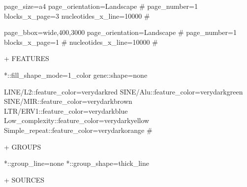 \documentclass[11pt]{article}
\def\nwendcode{\endtrivlist \endgroup} %
\let\nwdocspar=\par                    %
\begin{document}
\nwenddocs{}\endmoddef
page_size=a4
page_orientation=Landscape
# page_number=1
blocks_x_page=3
nucleotides_x_line=10000
#
\nwendcode{}\nwdocspar

\nwenddocs{}\endmoddef
page_bbox=wide,400,3000
page_orientation=Landscape
# page_number=1
blocks_x_page=1
# nucleotides_x_line=10000
#
\nwendcode{}\nwdocspar

+ FEATURES

\nwenddocs{}\endmoddef
*::fill_shape_mode=1_color
gene::shape=none
\nwendcode{}\nwdocspar

\nwenddocs{}\endmoddef
LINE/L2::feature_color=verydarkred
SINE/Alu::feature_color=verydarkgreen
SINE/MIR::feature_color=verydarkbrown
LTR/ERV1::feature_color=verydarkblue
Low_complexity::feature_color=verydarkyellow
Simple_repeat::feature_color=verydarkorange
#
\nwendcode{}\nwdocspar

+ GROUPS

\nwenddocs{}\endmoddef
*::group_line=none
*::group_shape=thick_line
\nwendcode{}\nwdocspar

+ SOURCES
\end{document}

